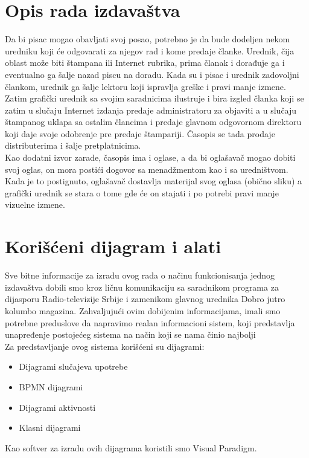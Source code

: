 \section{Opis rada izdavaštva}

Da bi pisac mogao obavljati svoj posao, potrebno je da bude dodeljen nekom uredniku koji će odgovarati za njegov rad i kome predaje članke. Urednik, čija oblast može biti štampana ili Internet rubrika, prima članak i dorađuje ga i eventualno ga šalje nazad piscu na doradu. Kada su i pisac i urednik zadovoljni člankom, urednik ga šalje lektoru koji ispravlja greške i pravi manje izmene. \\

Zatim grafički urednik sa svojim saradnicima ilustruje i bira izgled članka koji se zatim u slučaju Internet izdanja predaje administratoru za objaviti a u slučaju štampanog uklapa sa ostalim člancima i predaje glavnom odgovornom direktoru koji daje svoje odobrenje pre predaje štampariji. Časopis se tada prodaje distributerima i šalje pret\-plat\-ni\-ci\-ma. \\

Kao dodatni izvor zarade, časopis ima i oglase, a da bi oglašavač mogao dobiti svoj oglas, on mora postići dogovor sa menadžmentom kao i sa uredništvom. Kada je to postignuto, oglašavač dostavlja materijal svog oglasa (obično sliku) a grafički urednik se stara o tome gde će on stajati i po potrebi pravi manje vizuelne izmene. \\

\section{Korišćeni dijagram i alati}
Sve bitne informacije za izradu ovog rada o načinu funkcionisanja jednog izdavaštva dobili smo kroz ličnu komunikaciju sa saradnikom programa za dijasporu Radio-televizije Srbije i zamenikom glavnog urednika Dobro jutro kolumbo magazina. Zahvaljujući ovim dobijenim informacijama, imali smo potrebne preduslove da napravimo realan informacioni sistem, koji predstavlja unapređenje postojećeg sistema na način koji se nama činio najbolji \\

Za predstavljanje ovog sistema korišćeni su dijagrami: \\
\begin{itemize}
\item Dijagrami slučajeva upotrebe
\item BPMN dijagrami
\item Dijagrami aktivnosti
\item Klasni dijagrami
\end{itemize}

Kao softver za izradu ovih dijagrama koristili smo Visual Paradigm.